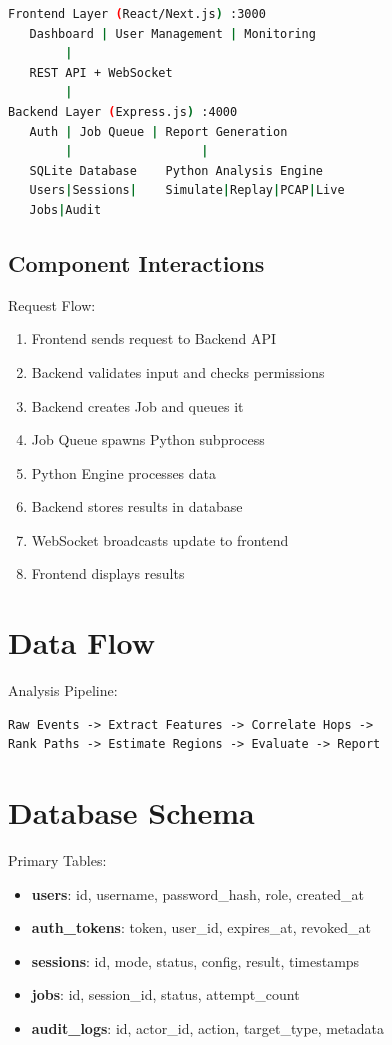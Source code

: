 \documentclass[12pt,a4paper]{report}
\begin{document}
\begin{lstlisting}[language=bash]
Frontend Layer (React/Next.js) :3000
   Dashboard | User Management | Monitoring
        |
   REST API + WebSocket
        |
Backend Layer (Express.js) :4000
   Auth | Job Queue | Report Generation
        |                  |
   SQLite Database    Python Analysis Engine
   Users|Sessions|    Simulate|Replay|PCAP|Live
   Jobs|Audit
\end{lstlisting}

\subsection{Component Interactions}

Request Flow:
\begin{enumerate}
    \item Frontend sends request to Backend API
    \item Backend validates input and checks permissions
    \item Backend creates Job and queues it
    \item Job Queue spawns Python subprocess
    \item Python Engine processes data
    \item Backend stores results in database
    \item WebSocket broadcasts update to frontend
    \item Frontend displays results
\end{enumerate}

\section{Data Flow}

Analysis Pipeline:

\begin{lstlisting}
Raw Events -> Extract Features -> Correlate Hops -> 
Rank Paths -> Estimate Regions -> Evaluate -> Report
\end{lstlisting}

\section{Database Schema}

Primary Tables:
\begin{itemize}
    \item \textbf{users}: id, username, password\_hash, role, created\_at
    \item \textbf{auth\_tokens}: token, user\_id, expires\_at, revoked\_at
    \item \textbf{sessions}: id, mode, status, config, result, timestamps
    \item \textbf{jobs}: id, session\_id, status, attempt\_count
    \item \textbf{audit\_logs}: id, actor\_id, action, target\_type, metadata
\end{itemize}
\end{document}
